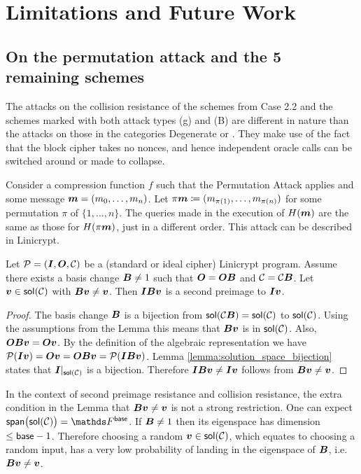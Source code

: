 \chapter{Limitations and Future Work}

\section{On the permutation attack and the 5 remaining schemes}
The attacks on the collision resistance of the schemes from Case 2.2 and the schemes marked with both attack types (g) and (B)
are different in nature than the attacks on those in the categories Degenerate or \OHCS.
They make use of the fact that the block cipher takes no nonces,
and hence independent oracle calls can be switched around or made to collapse.

Consider a compression function $f$ such that the Permutation Attack applies and some message $\boldsymbol m = (m_0, \dots, m_n)$.
Let $\pi \boldsymbol m \coloneqq (m_{\pi(1)}, \dots, m_{\pi(n)})$ for some permutation $\pi$ of $\{1,\dots,n\}$.
The queries made in the execution of $H(\boldsymbol m)$ are the same as those for $H(\pi\boldsymbol m)$,
just in a different order.
This attack can be described in Linicrypt.

\begin{lemma}
    Let $\mathcal{P} = (\boldsymbol{I}, \boldsymbol{O}, \mathcal{C})$ be a (standard or ideal cipher) Linicrypt program.
    Assume there exists a basis change $\boldsymbol{B} \neq 1$ such that $\boldsymbol{O} = \boldsymbol{O}\boldsymbol{B}$ and $\mathcal{C} = \mathcal{C}\boldsymbol{B}$.
    Let $\boldsymbol v \in \mathsf{sol}(\mathcal{C})$ with $\boldsymbol{B}\boldsymbol v \neq \boldsymbol v$.
    Then $\boldsymbol{I}\boldsymbol{B}\boldsymbol v$ is a second preimage to $\boldsymbol{I}\boldsymbol v$.
\end{lemma}
\begin{proof}
    The basis change $\boldsymbol{B}$ is a bijection from $\mathsf{sol}(\mathcal{C}\boldsymbol{B}) = \mathsf{sol}(\mathcal{C})$ to $\mathsf{sol}(\mathcal{C})$.
    Using the assumptions from the Lemma this means that $\boldsymbol{B}\boldsymbol v$ is in $\mathsf{sol}(\mathcal{C})$.
    Also, $\boldsymbol{O}\boldsymbol{B}\boldsymbol v = \boldsymbol{O}\boldsymbol v$.
    By the definition of the algebraic representation we have
    $\mathcal{P}(\boldsymbol{I}\boldsymbol v) = \boldsymbol{O}\boldsymbol v = \boldsymbol{O}\boldsymbol{B}\boldsymbol v = \mathcal{P}(\boldsymbol{I}\boldsymbol{B}\boldsymbol v)$.
    Lemma \ref{lemma:solution_space_bijection} states that $\boldsymbol{I}|_{\mathsf{sol}(\mathcal{C})}$ is a bijection.
    Therefore $\boldsymbol{I}\boldsymbol{B}\boldsymbol v \neq \boldsymbol{I}\boldsymbol v$ follows from $\boldsymbol{B}\boldsymbol v \neq \boldsymbol v$.
\end{proof}
In the context of second preimage resistance and collision resistance,
the extra condition in the Lemma that $\boldsymbol{B}\boldsymbol v \neq \boldsymbol v$ is not a strong restriction.
One can expect $\spn\big(\sol(\C)\big) = \Fsp$.
If $\boldsymbol{B} \neq 1$ then its eigenspace has dimension $\leq \mathsf{base} - 1$.
Therefore choosing a random $\boldsymbol v \in \mathsf{sol}(\mathcal{C})$, which equates to choosing a random input,
has a very low probability of landing in the eigenspace of $\boldsymbol{B}$, i.e. $\boldsymbol{B}\boldsymbol v \neq \boldsymbol v$.

